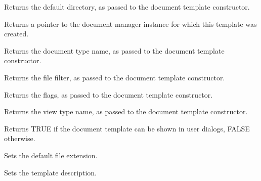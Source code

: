 

Returns the default directory, as passed to the document template constructor.



Returns a pointer to the document manager instance for which this template was created.



Returns the document type name, as passed to the document template constructor.



Returns the file filter, as passed to the document template constructor.



Returns the flags, as passed to the document template constructor.



Returns the view type name, as passed to the document template constructor.



Returns TRUE if the document template can be shown in user dialogs, FALSE otherwise.



Sets the default file extension.



Sets the template description.



